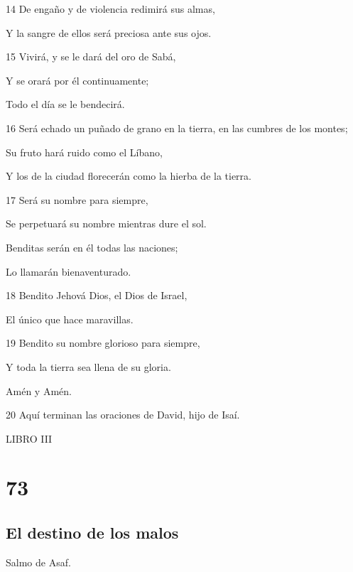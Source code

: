 \par 14 De engaño y de violencia redimirá sus almas,
\par Y la sangre de ellos será preciosa ante sus ojos.
\par 15 Vivirá, y se le dará del oro de Sabá,
\par Y se orará por él continuamente;
\par Todo el día se le bendecirá.
\par 16 Será echado un puñado de grano en la tierra, en las cumbres de los montes;
\par Su fruto hará ruido como el Líbano,
\par Y los de la ciudad florecerán como la hierba de la tierra.
\par 17 Será su nombre para siempre,
\par Se perpetuará su nombre mientras dure el sol.
\par Benditas serán en él todas las naciones;
\par Lo llamarán bienaventurado.
\par 18 Bendito Jehová Dios, el Dios de Israel,
\par El único que hace maravillas.
\par 19 Bendito su nombre glorioso para siempre,
\par Y toda la tierra sea llena de su gloria.
\par Amén y Amén.
\par 20 Aquí terminan las oraciones de David, hijo de Isaí.


\par LIBRO III

\chapter{73}

\section*{El destino de los malos}

\par Salmo de Asaf.

